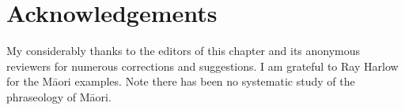 \documentclass[output=paper]{langsci/langscibook}
\begin{document}
\section*{Acknowledgements}

My considerably thanks to the editors of this chapter 
and its anonymous reviewers for numerous corrections and suggestions.  I 
am grateful to Ray Harlow for the M\=aori examples. Note there has been no 
systematic study of the phraseology of M\=aori.





{\sloppy
\printbibliography[heading=subbibliography,notkeyword=this]
}
\end{document}

